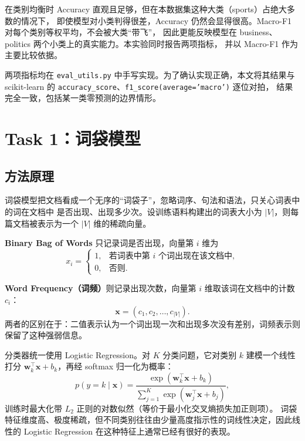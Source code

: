 \documentclass[a4paper]{article}
\begin{document}
在类别均衡时 Accuracy 直观且足够，但在本数据集这种大类（sports）占绝大多数的情况下，
即使模型对小类判得很差，Accuracy 仍然会显得很高。Macro-F1 对每个类别等权平均，不会被大类“带飞”，
因此更能反映模型在 business、politics 两个小类上的真实能力。本实验同时报告两项指标，
并以 Macro-F1 作为主要比较依据。

两项指标均在 \texttt{eval\_utils.py} 中手写实现。为了确认实现正确，本文将其结果与
scikit-learn 的 \texttt{accuracy\_score}、\texttt{f1\_score(average='macro')} 逐位对拍，
结果完全一致，包括某一类零预测的边界情形。

\section{Task 1：词袋模型}
\label{sec:task1}

\subsection{方法原理}

词袋模型把文档看成一个无序的“词袋子”，忽略词序、句法和语法，只关心词表中的词在文档中
是否出现、出现多少次。设训练语料构建出的词表大小为 $|V|$，则每篇文档被表示为一个
$|V|$ 维的稀疏向量。

\textbf{Binary Bag of Words} 只记录词是否出现，向量第 $i$ 维为
\begin{equation}
  x_i =
  \begin{cases}
    1, & \text{若词表中第 } i \text{ 个词出现在该文档中},\\
    0, & \text{否则}.
  \end{cases}
\end{equation}

\textbf{Word Frequency（词频）}则记录出现次数，向量第 $i$ 维取该词在文档中的计数 $c_i$：
\begin{equation}
  \mathbf{x} = (c_1, c_2, \ldots, c_{|V|}).
\end{equation}
两者的区别在于：二值表示认为一个词出现一次和出现多次没有差别，词频表示则保留了这种强弱信息。

分类器统一使用 Logistic Regression。对 $K$ 分类问题，它对类别 $k$ 建模一个线性打分
$\mathbf{w}_k^\top\mathbf{x}+b_k$，再经 softmax 归一化为概率：
\begin{equation}
  p(y=k\mid\mathbf{x}) =
  \frac{\exp(\mathbf{w}_k^\top\mathbf{x}+b_k)}
       {\sum_{j=1}^{K}\exp(\mathbf{w}_j^\top\mathbf{x}+b_j)},
\end{equation}
训练时最大化带 $L_2$ 正则的对数似然（等价于最小化交叉熵损失加正则项）。
词袋特征维度高、极度稀疏，但不同类别往往由少量高度指示性的词线性决定，因此线性的
Logistic Regression 在这种特征上通常已经有很好的表现。
\end{document}
